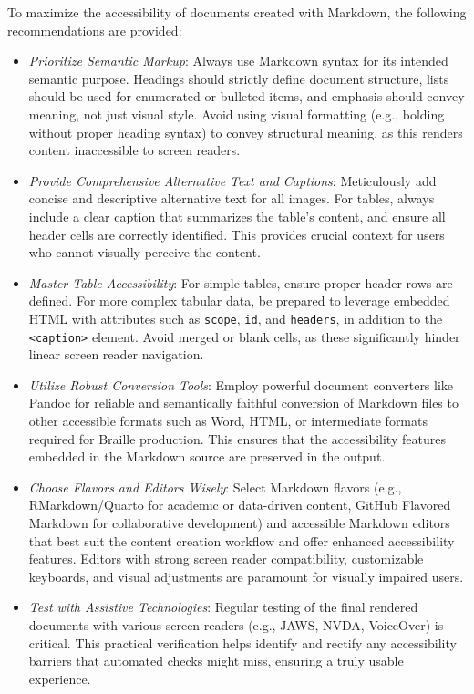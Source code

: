 To maximize the accessibility of documents created with Markdown, the following recommendations are provided:

\begin{itemize}
    \item \emph{Prioritize Semantic Markup}: Always use Markdown syntax for its intended semantic purpose. Headings should strictly define document structure, lists should be used for enumerated or bulleted items, and emphasis should convey meaning, not just visual style. Avoid using visual formatting (e.g., bolding without proper heading syntax) to convey structural meaning, as this renders content inaccessible to screen readers.
    \item \emph{Provide Comprehensive Alternative Text and Captions}: Meticulously add concise and descriptive alternative text for all images. For tables, always include a clear caption that summarizes the table's content, and ensure all header cells are correctly identified. This provides crucial context for users who cannot visually perceive the content.
    \item \emph{Master Table Accessibility}: For simple tables, ensure proper header rows are defined. For more complex tabular data, be prepared to leverage embedded HTML with attributes such as \texttt{scope}, \texttt{id}, and \texttt{headers}, in addition to the \texttt{<caption>} element. Avoid merged or blank cells, as these significantly hinder linear screen reader navigation.
    \item \emph{Utilize Robust Conversion Tools}: Employ powerful document converters like Pandoc for reliable and semantically faithful conversion of Markdown files to other accessible formats such as Word, HTML, or intermediate formats required for Braille production. This ensures that the accessibility features embedded in the Markdown source are preserved in the output.
    \item \emph{Choose Flavors and Editors Wisely}: Select Markdown flavors (e.g., RMarkdown/Quarto for academic or data-driven content, GitHub Flavored Markdown for collaborative development) and accessible Markdown editors that best suit the content creation workflow and offer enhanced accessibility features. Editors with strong screen reader compatibility, customizable keyboards, and visual adjustments are paramount for visually impaired users.
    \item \emph{Test with Assistive Technologies}: Regular testing of the final rendered documents with various screen readers (e.g., JAWS, NVDA, VoiceOver) is critical. This practical verification helps identify and rectify any accessibility barriers that automated checks might miss, ensuring a truly usable experience.

\end{itemize}
